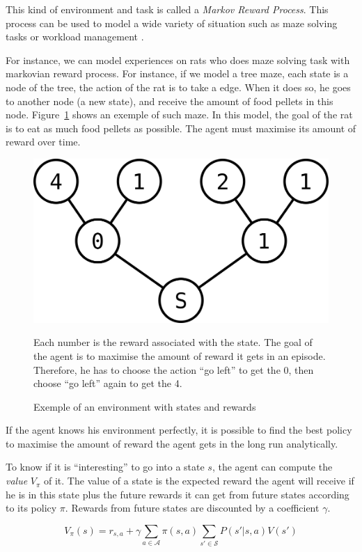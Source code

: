 \documentclass[]{article}
\begin{document}
This kind of environment and task is called a \emph{Markov Reward Process}. This process can be used to model a wide variety of situation such as maze solving tasks or workload management \parencite{sutton_reinforcement_1998,vanseijen_deeper_2015}.

For instance, we can model experiences on rats who does maze solving task with markovian reward process. For instance, if we model a tree maze, each state is a node of the tree, the action of the rat is to take a edge. When it does so, he goes to another node (a new state), and receive the amount of food pellets in this node. Figure~\ref{fig:mdp_tree} shows an exemple of such maze. In this model, the goal of the rat is to eat as much food pellets as possible. The agent must maximise its amount of reward over time.

\begin{figure}[htpb]
  {\centering
  \includegraphics[width=0.6\linewidth]{images/mdp_tree.png}
  \caption{Exemple of an environment with states and rewards\label{fig:mdp_tree}}}
  \small
  Each number is the reward associated with the state. The goal of the agent is to maximise the amount of reward it gets in an episode. Therefore, he has to choose the action ``go left'' to get the 0, then choose ``go left'' again to get the 4.
\end{figure}

If the agent knows his environment perfectly, it is possible to find the best policy to maximise the amount of reward the agent gets in the long run analytically.

To know if it is ``interesting'' to go into a state \(s\), the agent can compute the \emph{value} \(V_\pi\) of it. The value of a state is the expected reward the agent will receive if he is in this state plus the future rewards it can get from future states according to its policy \(\pi\). Rewards from future states are discounted by a coefficient \(\gamma\).

\begin{equation}
  V_\pi(s) = r_{s, a} + \gamma \sum_{a\in\mathcal{A}} \pi(s,a)\sum_{s'\in\mathcal{S}} P(s'|s, a) V(s')
\end{equation}
\end{document}
